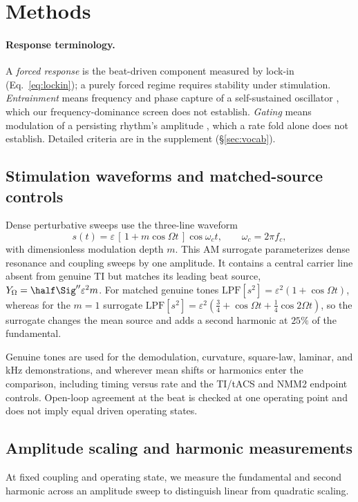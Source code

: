 \section{Methods}

\paragraph{Response terminology.}\label{sec:vocab-methods}
A \emph{forced response} is the beat-driven component measured by lock-in
(Eq.~\eqref{eq:lockin}); a purely forced regime requires stability under
stimulation. \emph{Entrainment} means frequency and phase capture of a self-sustained
oscillator \cite{pikovsky2001}, which our frequency-dominance screen does not
establish. \emph{Gating} means modulation of a persisting rhythm's amplitude
\cite{canolty2010,tort2010}, which a rate fold alone does not establish. Detailed criteria
are in the supplement (\S\ref{sec:vocab}).

\subsection{Stimulation waveforms and matched-source controls}\label{sec:waveforms}
Dense perturbative sweeps use the three-line waveform
\begin{equation}
s(t)=\varepsilon\,[\,1+m\cos\Omega t\,]\cos\omega_c t,\qquad \omega_c=2\pi f_c ,
\label{eq:amsur}
\end{equation}
with dimensionless modulation depth $m$. This AM surrogate parameterizes dense resonance
and coupling sweeps by one amplitude. It contains a central carrier line absent from
genuine TI but matches its leading beat source, $Y_\Omega=\half\Sig''\varepsilon^2m$.
For matched genuine tones $\mathrm{LPF}[s^2]=\varepsilon^2(1+\cos\Omega t)$, whereas for
the $m=1$ surrogate
$\mathrm{LPF}[s^2]=\varepsilon^2(\tfrac34+\cos\Omega t+\tfrac14\cos2\Omega t)$, so the
surrogate changes the mean source and adds a second harmonic at $25\%$ of the
fundamental.

Genuine tones are used for the demodulation, curvature, square-law, laminar, and kHz
demonstrations, and wherever mean shifts or harmonics enter the comparison, including
timing versus rate and the TI/tACS and NMM2 endpoint controls. Open-loop agreement at
the beat is checked at one operating point and does not imply equal driven operating
states.

\subsection{Amplitude scaling and harmonic measurements}\label{sec:transduction-methods}
At fixed coupling and operating state, we measure the fundamental and second
harmonic across an amplitude sweep to distinguish linear from quadratic scaling.

